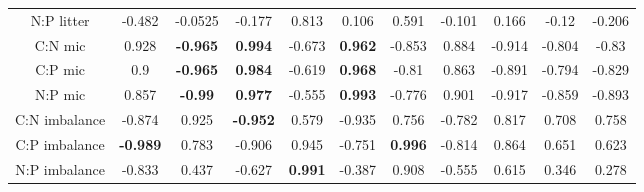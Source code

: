 \documentclass[authoryear,preprint,review,12pt]{elsarticle}
\begin{document}
\begin{table}[h!]
\begin{center}
{\begin{tabular}{ccccccccccc}
  N:P litter & -0.482 & -0.0525 & -0.177 & 0.813 & 0.106 & 0.591 & -0.101 & 0.166 & -0.12 & -0.206 \\ 
  C:N mic & 0.928 & \textbf{ -0.965 } & \textbf{ 0.994 } & -0.673 & \textbf{ 0.962 } & -0.853 & 0.884 & -0.914 & -0.804 & -0.83 \\ 
  C:P mic &  0.9 & \textbf{ -0.965 } & \textbf{ 0.984 } & -0.619 & \textbf{ 0.968 } & -0.81 & 0.863 & -0.891 & -0.794 & -0.829 \\ 
  N:P mic & 0.857 & \textbf{ -0.99 } & \textbf{ 0.977 } & -0.555 & \textbf{ 0.993 } & -0.776 & 0.901 & -0.917 & -0.859 & -0.893 \\ 
  C:N imbalance & -0.874 & 0.925 & \textbf{ -0.952 } & 0.579 & -0.935 & 0.756 & -0.782 & 0.817 & 0.708 & 0.758 \\ 
  C:P imbalance & \textbf{ -0.989 } & 0.783 & -0.906 & 0.945 & -0.751 & \textbf{ 0.996 } & -0.814 & 0.864 & 0.651 & 0.623 \\ 
  N:P imbalance & -0.833 & 0.437 & -0.627 & \textbf{ 0.991 } & -0.387 & 0.908 & -0.555 & 0.615 & 0.346 & 0.278 \\ 
   \hline
\end{tabular}
}
\end{center}
\end{table}
\newpage
\end{document}
